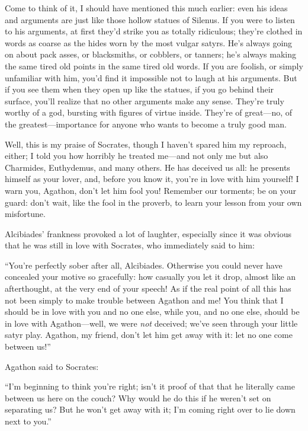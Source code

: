 Come to think of it, I should have mentioned this much earlier: even his
ideas and arguments are just like those hollow statues of Silenus. If
 you were to listen to his arguments, at first they'd strike you
as totally ridiculous; they're clothed in words as coarse as the hides
worn by the most vulgar satyrs. He's always going on about pack asses,
or blacksmiths, or cobblers, or tanners; he's always making the same
tired old points in the same tired old words. If you are foolish, or
simply unfamiliar with him, you'd find it impossible not to laugh at his
arguments. But if you  see them when they open up like
the statues, if you go behind their surface, you'll realize that no
other arguments make any sense. They're truly worthy of a god, bursting
with figures of virtue inside. They're of great---no, of the
greatest---importance for anyone who wants to become a truly good man.

Well, this is my praise of Socrates, though I haven't spared him my
 reproach, either; I told you how horribly he treated me---and
not only me but also Charmides, Euthydemus, and many others. He has
deceived us all: he presents himself as your lover, and, before you know
it, you're in love with him yourself! I warn you, Agathon, don't let him
fool you! Remember our torments; be on your guard: don't wait, like the
fool in the  proverb, to learn your lesson from your own
misfortune.

\blank[line]

Alcibiades' frankness provoked a lot of laughter, especially since it
was obvious that he was still in love with Socrates, who immediately
said to him:

“You're perfectly sober after all, Alcibiades. Otherwise you could never
have concealed your motive so gracefully: how casually you let it drop,
almost like an afterthought, at the very end of your speech! As if the
real  point of all this has not been simply to make trouble
between Agathon and me! You think that I should be in love with you and
no one else, while you, and no one else, should be in love with
Agathon---well, we were {\em not} deceived; we've seen through your
little satyr play. Agathon, my friend, don't let him get away with it:
let no one come between us!”

Agathon said to Socrates:

 “I'm beginning to think you're right; isn't it proof of that
that he literally came between us here on the couch? Why would he do
this if he weren't set on separating us? But he won't get away with it;
I'm coming right over to lie down next to you.”

